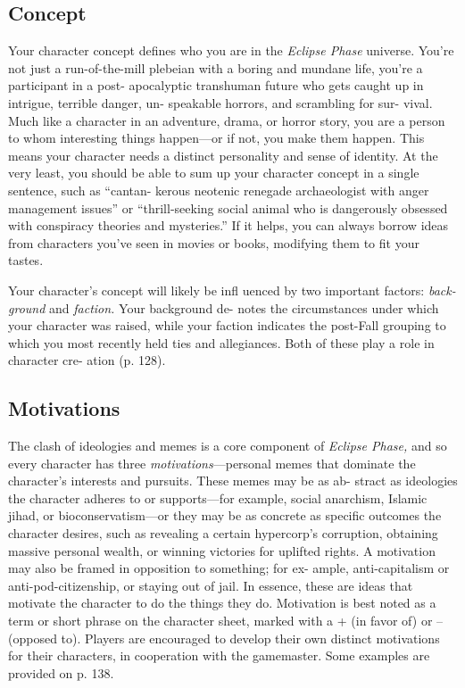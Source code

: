 \subsection{Concept}

Your character concept defines who you are 
in the \textit{Eclipse Phase }universe. You're not just 
a run-of-the-mill plebeian with a boring and 
mundane life, you're a participant in a post-
apocalyptic transhuman future who gets 
caught up in intrigue, terrible danger, un-
speakable horrors, and scrambling for sur-
vival. Much like a character in an adventure, 
drama, or horror story, you are a person 
to whom interesting things happen—or if 
not, you make them happen. This means 
your character needs a distinct personality 
and sense of identity. At the very least, you 
should be able to sum up your character 
concept in a single sentence, such as ``cantan-
kerous neotenic renegade archaeologist with 
anger management issues'' or ``thrill-seeking 
social animal who is dangerously obsessed 
with conspiracy theories and mysteries.'' If 
it helps, you can always borrow ideas from 
characters you've seen in movies or books, 
modifying them to fit your tastes.

Your character's concept will likely be 
infl uenced by two important factors: \textit{back-}
\textit{ground} and \textit{faction.} Your background de-
notes the circumstances under which your 
character was raised, while your faction 
indicates the post-Fall grouping to which 
you most recently held ties and allegiances. 
Both of these play a role in character cre-
ation (p. 128).

\subsection{Motivations}

The clash of ideologies and memes is a core 
component of \textit{Eclipse Phase,} and so every 
character has three \textit{motivations}—personal 
memes that dominate the character's interests 
and pursuits. These memes may be as ab-
stract as ideologies the character adheres to 
or supports—for example, social anarchism, 
Islamic jihad, or bioconservatism—or they 
may be as concrete as specific outcomes the 
character desires, such as revealing a certain 
hypercorp's corruption, obtaining massive 
personal wealth, or winning victories for 
uplifted rights. A motivation may also be 
framed in opposition to something; for ex-
ample, anti-capitalism or anti-pod-citizenship, 
or staying out of jail. In essence, these are 
ideas that motivate the character to do the 
things they do. Motivation is best noted as a 
term or short phrase on the character sheet, 
marked with a + (in favor of) or – (opposed 
to). Players are encouraged to develop their 
own distinct motivations for their characters, 
in cooperation with the gamemaster. Some 
examples are provided on p. 138.

